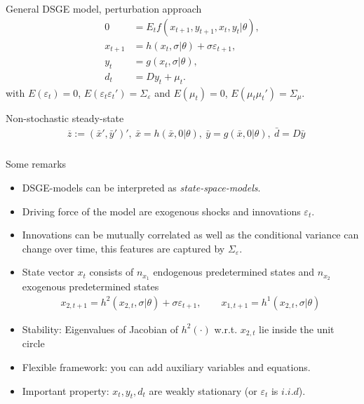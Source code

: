 \documentclass[handout]{beamer}  %
\begin{document}
\begin{frame}
\frametitle{\secname}
\begin{block}{General DSGE model, perturbation approach}
\begin{align*}
   0 &=   E_t f \left( x_{t+1},y_{t+1},x_t,y_t|\theta \right),\\
 x_{t+1}  &= h(x_{t},\sigma|\theta) + \sigma \varepsilon_{t+1},\\
   y_t &= g(x_t,\sigma|\theta) ,\\
   d_t &= D y_t+  \mu_{t}.
\end{align*}
with $E(\varepsilon_t)=0$, $E(\varepsilon_t\varepsilon_t')=\Sigma_\varepsilon$ and $E(\mu_t)=0$, $E(\mu_t\mu_t')=\Sigma_\mu$.
\end{block}

\begin{block}{Non-stochastic steady-state}
\begin{eqnarray*}
&\overline{z}:=(\bar{x}',\bar{y}')',~ \bar{x}=h(\bar{x},0|\theta),~ \bar{y}=g(\bar{x},0|\theta),~\bar{d} = D \bar{y}
\end{eqnarray*}
\end{block}
\end{frame}

\begin{frame}
\frametitle{\secname}
Some remarks
\begin{itemize}
   \item  DSGE-models can be interpreted as \emph{state-space-models}.
\item Driving force of the model are exogenous shocks and innovations $\varepsilon_t$.
\item Innovations can be mutually correlated as well as the conditional variance can change over time, this features are captured by $\Sigma_\varepsilon$.
\item State vector $x_t$ consists of $n_{x_1}$ endogenous predetermined states and $n_{x_2}$ exogenous predetermined states
 \begin{align*}
   x_{2,t+1} = h^2(x_{2,t},\sigma|\theta) + \sigma \varepsilon_{t+1}, \qquad x_{1,t+1} = h^1(x_{2,t},\sigma|\theta)
 \end{align*}
 \item Stability: Eigenvalues of Jacobian of $h^2(\cdot)$ w.r.t. $x_{2,t}$ lie inside the unit circle
\item Flexible framework: you can add auxiliary variables and equations.
 \item Important property: $x_t,y_t,d_t$ are weakly stationary (or $\varepsilon_t$ is $i.i.d$).
\end{itemize}
\end{frame}
\end{document}
